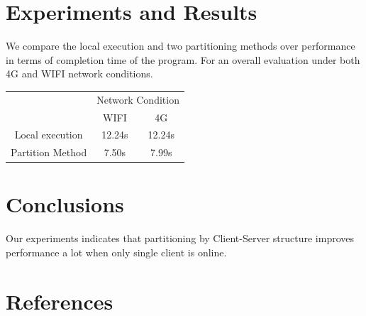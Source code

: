 \documentclass[a4paper,11pt,onecolumn,twoside]{article}
\begin{document}
\begin{CJK*}{GBK}{song}
\section{Experiments and Results}

We compare the local execution and two partitioning methods 
over performance in terms of completion time of the program.
For an overall evaluation under both 4G and WIFI network conditions. 

\begin{table}[!hbt]\label{tb:result}
  \centering
  \begin{tabular}{|c|c|c|}
  \hline
  \multirow{2}{*}{} & \multicolumn{2}{c|}{Network Condition} \\ \cline{2-3} 
                                       & WIFI                & 4G              \\ \hline
  Local execution                      &  12.24s             &  12.24s         \\ \hline
  Partition Method                     &  7.50s              &  7.99s          \\ \hline
  \end{tabular}
  \end{table}

\section{Conclusions}

Our experiments indicates that partitioning by Client-Server structure improves performance a lot when only single client is online.

\section{References}

\nocite{1508.06576}
\nocite{tensorflow2015-whitepaper}


 



\clearpage
\end{CJK*}
\end{document}
